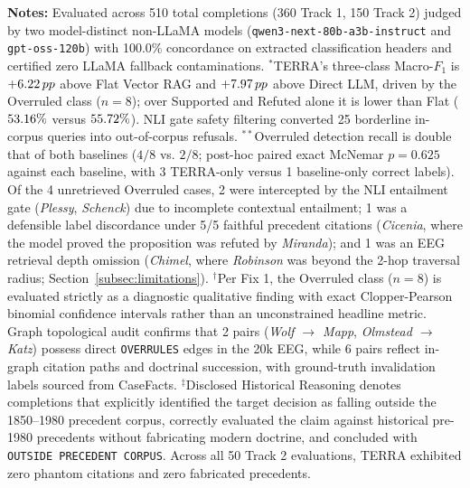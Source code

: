 \raggedright \fontsize{8.5}{10.5}\selectfont \textbf{Notes:} Evaluated across 510 total completions (360 Track 1, 150 Track 2) judged by two model-distinct non-LLaMA models (\texttt{qwen3-\allowbreak{}next-\allowbreak{}80b-\allowbreak{}a3b-\allowbreak{}instruct} and \texttt{gpt-\allowbreak{}oss-\allowbreak{}120b}) with 100.0\% concordance on extracted classification headers and certified zero LLaMA fallback contaminations.
$^*$TERRA's three-class Macro-$F_1$ is $+6.22\,pp$ above Flat Vector RAG and $+7.97\,pp$ above Direct LLM, driven by the Overruled class ($n=8$); over Supported and Refuted alone it is lower than Flat ($53.16\%$ versus $55.72\%$). NLI gate safety filtering converted 25 borderline in-corpus queries into out-of-corpus refusals.
$^{**}$Overruled detection recall is double that of both baselines ($4/8$ vs. $2/8$; post-hoc paired exact McNemar $p=0.625$ against each baseline, with 3 TERRA-only versus 1 baseline-only correct labels). Of the 4 unretrieved Overruled cases, 2 were intercepted by the NLI entailment gate (\textit{Plessy}, \textit{Schenck}) due to incomplete contextual entailment; 1 was a defensible label discordance under 5/5 faithful precedent citations (\textit{Cicenia}, where the model proved the proposition was refuted by \textit{Miranda}); and 1 was an EEG retrieval depth omission (\textit{Chimel}, where \textit{Robinson} was beyond the 2-hop traversal radius; Section~\ref{subsec:limitations}).
$^\dagger$Per Fix 1, the Overruled class ($n=8$) is evaluated strictly as a diagnostic qualitative finding with exact Clopper-Pearson binomial confidence intervals rather than an unconstrained headline metric. Graph topological audit confirms that 2 pairs (\textit{Wolf $\to$ Mapp}, \textit{Olmstead $\to$ Katz}) possess direct \texttt{OVERRULES} edges in the 20k EEG, while 6 pairs reflect in-graph citation paths and doctrinal succession, with ground-truth invalidation labels sourced from CaseFacts.
$^\ddagger$Disclosed Historical Reasoning denotes completions that explicitly identified the target decision as falling outside the 1850--1980 precedent corpus, correctly evaluated the claim against historical pre-1980 precedents without fabricating modern doctrine, and concluded with \texttt{OUTSIDE PRECEDENT CORPUS}. Across all 50 Track 2 evaluations, TERRA exhibited zero phantom citations and zero fabricated precedents.
\endgroup



